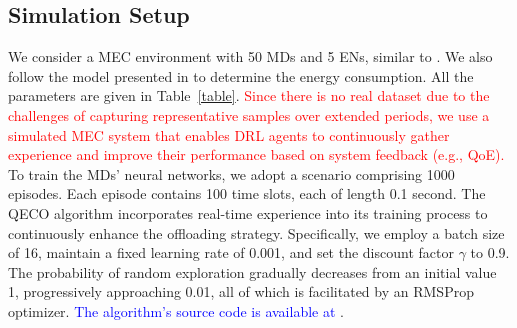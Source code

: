 \documentclass[10pt, journal,letterpaper]{IEEEtran}
\begin{document}



\subsection{Simulation Setup}
We consider a MEC environment with 50 MDs and 5 ENs, similar to \cite{9253665}. We also follow the model presented in \cite{zhou2021deep} to determine the energy consumption. All the parameters are given in Table~\ref{table}. \textcolor{red}{Since there is no real dataset due to the challenges of capturing representative samples over extended periods, we use a simulated MEC system that enables DRL agents to continuously gather experience and improve their performance based on system feedback (e.g., QoE).} To train the MDs' neural networks, we adopt a scenario comprising 1000 episodes. Each episode contains 100 time slots, each of length 0.1 second. The QECO algorithm incorporates real-time experience into its training process to continuously enhance the offloading strategy. Specifically, we employ a batch size of 16, maintain a fixed learning rate of 0.001, and set the discount factor $\gamma$ to 0.9. The probability of random exploration gradually decreases from an initial value 1, progressively approaching 0.01, all of which is facilitated by an RMSProp optimizer. \textcolor{blue}{The algorithm's source code is available at \cite{QECO}}.
	
	
	
\end{document}
